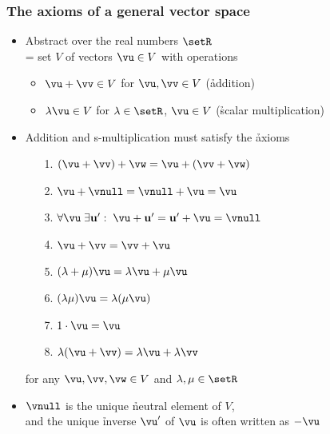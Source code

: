 \begin{frame}
  \frametitle{The axioms of a general vector space}

  \begin{itemize}
  \item Abstract  over the real numbers $\setR$\\
    = set $V$ of vectors $\vu \in V$ with operations
    \begin{itemize}
    \item $\vu + \vv\in V$ for $\vu,\vv\in V$ (\h{addition})
    \item $\lambda \vu\in V$ for $\lambda\in\setR$, $\vu\in V$ (\h{scalar multiplication})
    \end{itemize}
  \item Addition and s-multiplication must satisfy the \h{axioms}
    \begin{enumerate}
    \item[1.] $(\vu + \vv) + \vw = \vu + (\vv + \vw)$
    \item[2.] $\vu + \vnull = \vnull + \vu = \vu$
    \item[3.] $\forall \vu\; \exists \mathbf{u'}:\; \vu + \mathbf{u'} = \mathbf{u'} + \vu = \vnull$
    \item[4.] $\vu + \vv = \vv + \vu$
    \item[5.] $(\lambda + \mu) \vu = \lambda \vu + \mu \vu$
    \item[6.] $(\lambda \mu) \vu = \lambda (\mu \vu)$
    \item[7.] $1\cdot \vu = \vu$
    \item[8.] $\lambda (\vu + \vv) = \lambda \vu + \lambda \vv$
    \end{enumerate}
    for any $\vu, \vv, \vw\in V$ and $\lambda,\mu \in \setR$
  \item $\vnull$ is the unique \h{neutral element} of $V$,\\
    and the unique \h{inverse} $\vu'$ of $\vu$ is often written as $-\vu$
  \end{itemize}
\end{frame}

